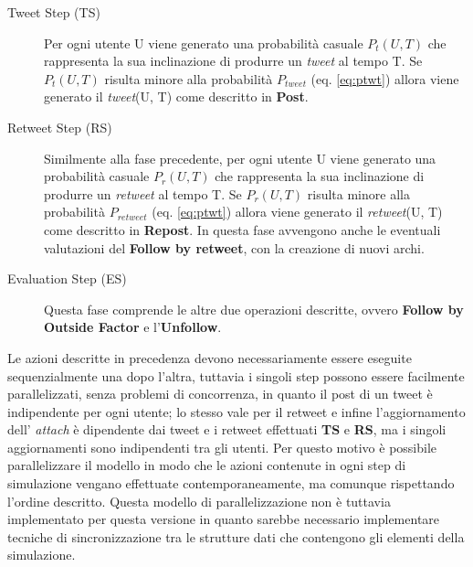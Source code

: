\documentclass[a4paper,12pt]{article}
\begin{document}
\begin{description}
  \item[Tweet Step (TS)] Per ogni utente U viene generato una 
  probabilit\`a casuale $P_t(U,T)$ che rappresenta la sua 
  inclinazione di produrre un \textit{tweet} al tempo T. Se $P_t(U,T)$
  risulta minore alla probabilit\`a $P_{tweet}$ (eq. \ref{eq:ptwt}) allora
  viene generato il \textit{tweet}(U, T) come descritto in \textbf{Post}.
  
  \item[Retweet Step (RS)] Similmente alla fase precedente,
  per ogni utente U viene generato una 
  probabilit\`a casuale $P_r(U,T)$ che rappresenta la sua 
  inclinazione di produrre un \textit{retweet} al tempo T. Se $P_r(U,T)$
  risulta minore alla probabilit\`a $P_{retweet}$ (eq. \ref{eq:ptwt}) 
  allora viene generato il \textit{retweet}(U, T) come descritto in 
  \textbf{Repost}. In questa fase avvengono anche le eventuali valutazioni del \textbf{Follow by retweet}, con la creazione di nuovi archi.
  
  \item[Evaluation Step (ES)] Questa fase comprende le altre due operazioni descritte, ovvero \textbf{Follow by Outside Factor} e l'\textbf{Unfollow}. 
\end{description}

Le azioni descritte in precedenza devono necessariamente essere 
eseguite sequenzialmente una dopo l'altra, tuttavia i singoli step 
possono essere facilmente parallelizzati, senza problemi di 
concorrenza, in quanto il post di un tweet \`e indipendente per ogni
utente; lo stesso vale per il retweet e infine l'aggiornamento dell'
\textit{attach} \`e  dipendente dai tweet e i retweet effettuati 
\textbf{TS} e \textbf{RS}, ma i singoli aggiornamenti sono 
indipendenti tra gli utenti. Per questo motivo \`e 
possibile parallelizzare il modello in modo che 
le azioni contenute in ogni step di simulazione 
vengano effettuate contemporaneamente, ma comunque rispettando l'ordine descritto.
Questa modello di parallelizzazione non \`e tuttavia implementato per questa versione in quanto sarebbe necessario implementare tecniche di sincronizzazione tra le strutture dati che contengono gli elementi della simulazione.
\end{document}
